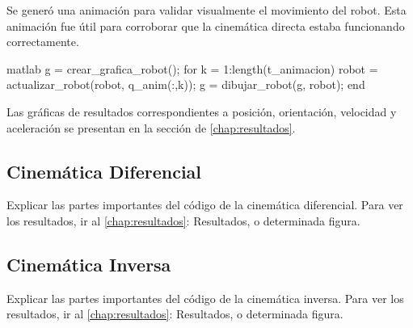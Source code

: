 Se generó una animación para validar visualmente el movimiento del robot. Esta animación fue útil para corroborar que la cinemática directa estaba funcionando correctamente.

\begin{matlabcode}{matlab}
	g = crear_grafica_robot();
	for k = 1:length(t_animacion)
	robot = actualizar_robot(robot, q_anim(:,k));
	g = dibujar_robot(g, robot);
	end
\end{matlabcode}

Las gráficas de resultados correspondientes a posición, orientación, velocidad y aceleración se presentan en la sección de \autoref{chap:resultados}.

\subsection{Cinemática Diferencial}
Explicar las partes importantes del código de la cinemática diferencial.
Para ver los resultados, ir al \autoref{chap:resultados}: Resultados, o determinada figura.
\subsection{Cinemática Inversa}
Explicar las partes importantes del código de la cinemática inversa.
Para ver los resultados, ir al \autoref{chap:resultados}: Resultados, o determinada figura.